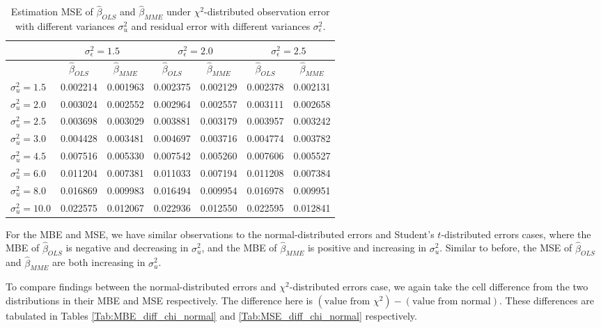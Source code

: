 \documentclass{article}
\begin{document}
\begin{table}[ht]
    \centering
    \caption{Estimation MSE of $\hat{\beta}_{OLS}$ and $\hat{\beta}_{MME}$ under $\chi^2$-distributed observation error with different variances $\sigma^2_u$ and residual error with different variances $\sigma^2_\epsilon$.}
    \label{Tab:MSE_chi}
    \begin{tabular}[t]{lcccccc}
        \hline
        &\multicolumn{2}{c}{$\sigma^2_\epsilon=1.5$}&\multicolumn{2}{c}{$\sigma^2_\epsilon=2.0$}&\multicolumn{2}{c}{$\sigma^2_\epsilon=2.5$}\\
        \hline
        &$\hat{\beta}_{OLS}$&$\hat{\beta}_{MME}$&$\hat{\beta}_{OLS}$&$\hat{\beta}_{MME}$&$\hat{\beta}_{OLS}$&$\hat{\beta}_{MME}$\\
        \hline
        $\sigma^2_u = 1.5$&0.002214&0.001963&0.002375&0.002129&0.002378&0.002131\\
        $\sigma^2_u = 2.0$&0.003024&0.002552&0.002964&0.002557&0.003111&0.002658\\
        $\sigma^2_u = 2.5$&0.003698&0.003029&0.003881&0.003179&0.003957&0.003242\\
        $\sigma^2_u = 3.0$&0.004428&0.003481&0.004697&0.003716&0.004774&0.003782\\
        $\sigma^2_u = 4.5$&0.007516&0.005330&0.007542&0.005260&0.007606&0.005527\\
        $\sigma^2_u = 6.0$&0.011204&0.007381&0.011033&0.007194&0.011208&0.007384\\
        $\sigma^2_u = 8.0$&0.016869&0.009983&0.016494&0.009954&0.016978&0.009951\\
        $\sigma^2_u = 10.0$&0.022575&0.012067&0.022936&0.012550&0.022595&0.012841\\
        \hline
    \end{tabular}
\end{table}

For the MBE and MSE, we have similar observations to the normal-distributed errors and Student's $t$-distributed errors cases,
where the MBE of $\hat{\beta}_{OLS}$ is negative and decreasing in $\sigma^2_u$, 
and the MBE of $\hat{\beta}_{MME}$ is positive and increasing in $\sigma^2_u$.
Similar to before, the MSE of $\hat{\beta}_{OLS}$ and $\hat{\beta}_{MME}$ are both increasing in $\sigma^2_u$.

To compare findings between the normal-distributed errors and $\chi^2$-distributed errors case,
we again take the cell difference from the two distributions in their MBE and MSE respectively.
The difference here is $(\textrm{value from } \chi^2) - (\textrm{value from normal})$. 
These differences are tabulated in Tables \ref{Tab:MBE_diff_chi_normal} and \ref{Tab:MSE_diff_chi_normal} respectively.
\end{document}
